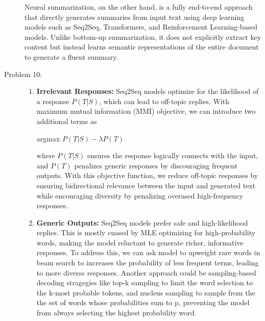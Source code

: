 \documentclass[10pt]{article}
\begin{document}
\begin{description}
Neural summarization, on the other hand, is a fully end-to-end approach that directly generates summaries from input text using deep learning models such as 
Seq2Seq, Transformers, and Reinforcement Learning-based models. Unlike bottom-up summarization, it does not explicitly extract key content but instead learns semantic representations of the entire document to generate a fluent summary.


\pagebreak

\item[Problem 10:]  \hfill %

\begin{enumerate}
    \item \textbf{Irrelevant Responses:} Seq2Seq models optimize for the likelihood of a response $P(T|S)$, which can lead to off-topic replies.
    With maximum mutual information (MMI) objective, we can introduce two additional terms as 

    \begin{center}
        argmax $P(T|S) - \lambda P(T)$
    \end{center}

    where $P(T|S)$ ensures the response logically connects with the input, and $P(T)$ penalizes generic responses by discouraging frequent outputs.
    With this objective function, we reduce off-topic responses by ensuring bidirectional relevance between the input and generated text while
    encouraging diversity by penalizing overused high-frequency responses.

    \item \textbf{Generic Outputs:} Seq2Seq models prefer safe and high-likelihood replies. This is mostly cuased by MLE optimizing for high-probability words, 
    making the model reluctant to generate richer, informative responses. To address this, we can ask model to upweight rare words in beam search to increases 
    the probability of less frequent terms, leading to more diverse responses. Another approach could be sampling-based decoding stragegies like top-k sampling to
    limit the word selection to the k-most probable tokens, and nucleus sampling to sample from the the set of words whose probabilities sum to p, 
    preventing the model from always selecting the highest probability word.


\end{enumerate}
\end{description}
\end{document}

